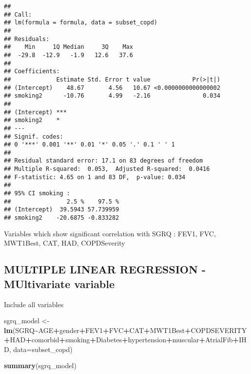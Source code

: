 \documentclass[
]{article}
\newenvironment{Shaded}{\begin{snugshade}}{\end{snugshade}}
\newcommand{\AttributeTok}[1]{\textcolor[rgb]{0.13,0.29,0.53}{#1}}
\newcommand{\FunctionTok}[1]{\textcolor[rgb]{0.13,0.29,0.53}{\textbf{#1}}}
\newcommand{\NormalTok}[1]{#1}
\newcommand{\OtherTok}[1]{\textcolor[rgb]{0.56,0.35,0.01}{#1}}
\newcommand{\SpecialCharTok}[1]{\textcolor[rgb]{0.81,0.36,0.00}{\textbf{#1}}}
\begin{document}
\begin{verbatim}
## 
## Call:
## lm(formula = formula, data = subset_copd)
## 
## Residuals:
##    Min     1Q Median     3Q    Max 
##  -29.8  -12.9   -1.9   12.6   37.6 
## 
## Coefficients:
##             Estimate Std. Error t value            Pr(>|t|)
## (Intercept)    48.67       4.56   10.67 <0.0000000000000002
## smoking2      -10.76       4.99   -2.16               0.034
##                
## (Intercept) ***
## smoking2    *  
## ---
## Signif. codes:  
## 0 '***' 0.001 '**' 0.01 '*' 0.05 '.' 0.1 ' ' 1
## 
## Residual standard error: 17.1 on 83 degrees of freedom
## Multiple R-squared:  0.053,  Adjusted R-squared:  0.0416 
## F-statistic: 4.65 on 1 and 83 DF,  p-value: 0.034
## 
## 95% CI smoking :
##                2.5 %    97.5 %
## (Intercept)  39.5943 57.739959
## smoking2    -20.6875 -0.833282
\end{verbatim}

Variables which show significant correlation with SGRQ : FEV1, FVC,
MWT1Best, CAT, HAD, COPDSeverity

\subsection{MULTIPLE LINEAR REGRESSION - MUltivariate
variable}\label{multiple-linear-regression---multivariate-variable}

Include all variables

\begin{Shaded}
\begin{Highlighting}[]
\NormalTok{sgrq\_model }\OtherTok{\textless{}{-}} \FunctionTok{lm}\NormalTok{(SGRQ}\SpecialCharTok{\textasciitilde{}}\NormalTok{AGE}\SpecialCharTok{+}\NormalTok{gender}\SpecialCharTok{+}\NormalTok{FEV1}\SpecialCharTok{+}\NormalTok{FVC}\SpecialCharTok{+}\NormalTok{CAT}\SpecialCharTok{+}\NormalTok{MWT1Best}\SpecialCharTok{+}\NormalTok{COPDSEVERITY}\SpecialCharTok{+}\NormalTok{HAD}\SpecialCharTok{+}\NormalTok{comorbid}\SpecialCharTok{+}\NormalTok{smoking}\SpecialCharTok{+}\NormalTok{Diabetes}\SpecialCharTok{+}\NormalTok{hypertension}\SpecialCharTok{+}\NormalTok{muscular}\SpecialCharTok{+}\NormalTok{AtrialFib}\SpecialCharTok{+}\NormalTok{IHD, }\AttributeTok{data=}\NormalTok{subset\_copd)}
\end{Highlighting}
\end{Shaded}

\begin{Shaded}
\begin{Highlighting}[]
\FunctionTok{summary}\NormalTok{(sgrq\_model)}
\end{Highlighting}
\end{Shaded}
\end{document}
